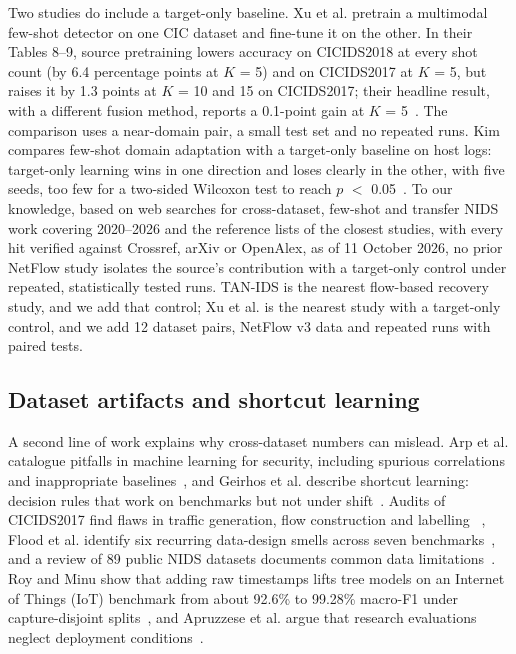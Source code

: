 \documentclass[11pt]{article}
\begin{document}
Two studies do include a target-only baseline. Xu et al. pretrain a multimodal few-shot detector on one CIC dataset and fine-tune it on the other. In their Tables 8--9, source pretraining lowers accuracy on CICIDS2018 at every shot count (by 6.4 percentage points at $K$ = 5) and on CICIDS2017 at $K$ = 5, but raises it by 1.3 points at $K$ = 10 and 15 on CICIDS2017; their headline result, with a different fusion method, reports a 0.1-point gain at $K$ = 5~\cite{xu2025multimodal}. The comparison uses a near-domain pair, a small test set and no repeated runs. Kim compares few-shot domain adaptation with a target-only baseline on host logs: target-only learning wins in one direction and loses clearly in the other, with five seeds, too few for a two-sided Wilcoxon test to reach $p$ $<$ 0.05~\cite{kim2026prototype}. To our knowledge, based on web searches for cross-dataset, few-shot and transfer NIDS work covering 2020--2026 and the reference lists of the closest studies, with every hit verified against Crossref, arXiv or OpenAlex, as of 11 October 2026, no prior NetFlow study isolates the source's contribution with a target-only control under repeated, statistically tested runs. TAN-IDS is the nearest flow-based recovery study, and we add that control; Xu et al. is the nearest study with a target-only control, and we add 12 dataset pairs, NetFlow v3 data and repeated runs with paired tests.

\subsection{Dataset artifacts and shortcut learning}

A second line of work explains why cross-dataset numbers can mislead. Arp et al. catalogue pitfalls in machine learning for security, including spurious correlations and inappropriate baselines~\cite{arp2022dos}, and Geirhos et al. describe shortcut learning: decision rules that work on benchmarks but not under shift~\cite{geirhos2020shortcut}. Audits of CICIDS2017 find flaws in traffic generation, flow construction and labelling ~\cite{engelen2021troubleshooting,lanvin2023errors}, Flood et al. identify six recurring data-design smells across seven benchmarks~\cite{flood2024bad}, and a review of 89 public NIDS datasets documents common data limitations~\cite{goldschmidt2025network}. Roy and Minu show that adding raw timestamps lifts tree models on an Internet of Things (IoT) benchmark from about 92.6\% to 99.28\% macro-F1 under capture-disjoint splits~\cite{roy2026unmasking}, and Apruzzese et al. argue that research evaluations neglect deployment conditions~\cite{apruzzese2023sok}.
\end{document}
